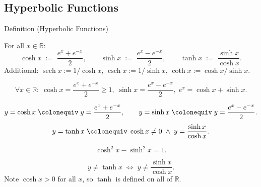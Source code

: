 
\subsection*{Hyperbolic Functions}
\label{sec:hyperbolic}

\begin{definitionbox}{Definition (Hyperbolic Functions)}
\begin{definition}
\label{def:hyperbolic}
For all $x \in \mathbb{R}$:
\[
  \cosh x \;:=\; \frac{e^x + e^{-x}}{2},
  \qquad
  \sinh x \;:=\; \frac{e^x - e^{-x}}{2},
  \qquad
  \tanh x \;:=\; \frac{\sinh x}{\cosh x}.
\]
Additional: $\operatorname{sech} x := 1/\cosh x$,\;
$\operatorname{csch} x := 1/\sinh x$,\;
$\coth x := \cosh x / \sinh x$.
\end{definition}
\end{definitionbox}

\begin{remark*}
\[
  \forall x \in \mathbb{R} :\;
  \cosh x = \frac{e^x + e^{-x}}{2} \geq 1,\;
  \sinh x = \frac{e^x - e^{-x}}{2},\;
  e^x = \cosh x + \sinh x.
\]
\end{remark*}

\begin{remark*}
\[
  y=\cosh x
  \;\colonequiv\;
  y = \frac{e^x + e^{-x}}{2},
  \qquad
  y=\sinh x
  \;\colonequiv\;
  y = \frac{e^x - e^{-x}}{2}.
\]
\[
  y=\tanh x
  \;\colonequiv\;
  \cosh x \neq 0 \;\wedge\; y = \frac{\sinh x}{\cosh x}.
\]


\[
  \cosh^2 x-\sinh^2 x=1.
\]
\end{remark*}

\begin{remark*}
\[
  y\neq\tanh x
  \;\iff\;
  y \neq \frac{\sinh x}{\cosh x}.
\]
Note $\cosh x > 0$ for all $x$, so $\tanh$ is defined on all of
$\mathbb{R}$.
\end{remark*}


